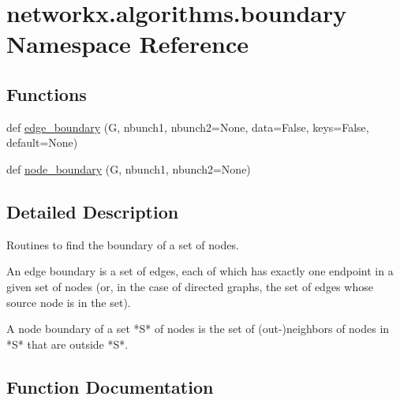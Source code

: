 \hypertarget{namespacenetworkx_1_1algorithms_1_1boundary}{}\section{networkx.\+algorithms.\+boundary Namespace Reference}
\label{namespacenetworkx_1_1algorithms_1_1boundary}
\subsection*{Functions}
\begin{DoxyCompactItemize}
\item 
def \hyperlink{namespacenetworkx_1_1algorithms_1_1boundary_a5176ed69ae699c17b00cf2ee049d7575}{edge\+\_\+boundary} (G, nbunch1, nbunch2=None, data=False, keys=False, default=None)
\item 
def \hyperlink{namespacenetworkx_1_1algorithms_1_1boundary_acc17d5483f9845383304f319285be86c}{node\+\_\+boundary} (G, nbunch1, nbunch2=None)
\end{DoxyCompactItemize}


\subsection{Detailed Description}
\begin{DoxyVerb}Routines to find the boundary of a set of nodes.

An edge boundary is a set of edges, each of which has exactly one
endpoint in a given set of nodes (or, in the case of directed graphs,
the set of edges whose source node is in the set).

A node boundary of a set *S* of nodes is the set of (out-)neighbors of
nodes in *S* that are outside *S*.\end{DoxyVerb}
 

\subsection{Function Documentation}
\mbox{\label{namespacenetworkx_1_1algorithms_1_1boundary_a5176ed69ae699c17b00cf2ee049d7575}} 
